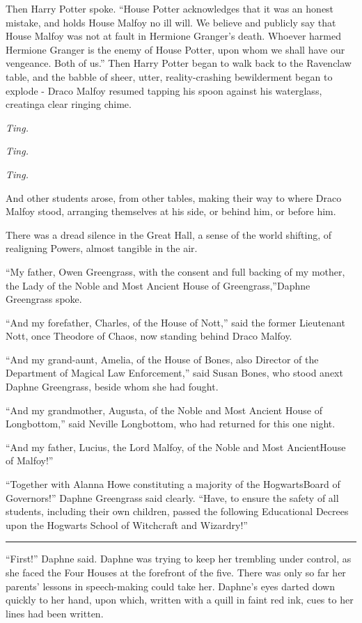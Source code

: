 Then Harry Potter spoke. ``House Potter acknowledges that it was an honest mistake, and holds House Malfoy no ill will. We believe and publicly say that House Malfoy was not at fault in Hermione Granger's death. Whoever harmed Hermione Granger is the enemy of House Potter, upon whom we shall have our vengeance. Both of us.''
Then Harry Potter began to walk back to the Ravenclaw table, and the babble of sheer, utter, reality-crashing bewilderment began to explode -
Draco Malfoy resumed tapping his spoon against his waterglass, creatinga clear ringing chime.

\emph{Ting.}

\emph{Ting.}

\emph{Ting.}

And other students arose, from other tables, making their way to where Draco Malfoy stood, arranging themselves at his side, or behind him, or before him.

There was a dread silence in the Great Hall, a sense of the world shifting, of realigning Powers, almost tangible in the air.

``My father, Owen Greengrass, with the consent and full backing of my mother, the Lady of the Noble and Most Ancient House of Greengrass,''Daphne Greengrass spoke.

``And my forefather, Charles, of the House of Nott,'' said the former Lieutenant Nott, once Theodore of Chaos, now standing behind Draco Malfoy.

``And my grand-aunt, Amelia, of the House of Bones, also Director of the Department of Magical Law Enforcement,'' said Susan Bones, who stood anext Daphne Greengrass, beside whom she had fought.

``And my grandmother, Augusta, of the Noble and Most Ancient House of Longbottom,'' said Neville Longbottom, who had returned for this one night.

``And my father, Lucius, the Lord Malfoy, of the Noble and Most AncientHouse of Malfoy!''

``Together with Alanna Howe constituting a majority of the HogwartsBoard of Governors!'' Daphne Greengrass said clearly. ``Have, to ensure the safety of all students, including their own children, passed the following Educational Decrees upon the Hogwarts School of Witchcraft and Wizardry!''

\begin{center}\rule{3in}{0.4pt}\end{center}

``First!'' Daphne said. Daphne was trying to keep her trembling under control, as she faced the Four Houses at the forefront of the five. There was only so far her parents' lessons in speech-making could take her. Daphne's eyes darted down quickly to her hand, upon which, written with a quill in faint red ink, cues to her lines had been written.


